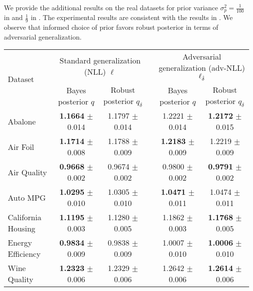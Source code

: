 We provide the additional results on the real datasets for prior variance $\sigma_p^2 = \frac{1}{100}$ in  and $\frac{1}{9}$ in . The experimental results are consistent with the results in . We observe that informed choice of prior favors robust posterior in terms of adversarial generalization.

\begin{table*}[h]
    \centering
    \begin{tabular}{lccccc}
    \toprule
    \multirow{2}{*}{Dataset}  %
       & \multicolumn{2}{c}{Standard generalization (NLL) $\ell$} & \phantom{}& \multicolumn{2}{c}{Adversarial generalization (adv-NLL) $\ell_{\hat{\delta}}$} \\
       & Bayes posterior $q$  & Robust posterior  $q_{\delta}$ & \phantom{}& Bayes posterior $q$ & Robust posterior $q_{\delta}$  \\
       \midrule
       Abalone & \textbf{1.1664} \tiny{$\pm$ 0.014} & 1.1797 \tiny{$\pm$ 0.014} && 1.2221 \tiny{$\pm$ 0.014} & \textbf{1.2172} \tiny{$\pm$ 0.015} \\
       Air Foil & \textbf{1.1714} \tiny{$\pm$ 0.008} & 1.1788 \tiny{$\pm$ 0.009} && \textbf{1.2183} \tiny{$\pm$ 0.009} & {1.2219} \tiny{$\pm$ 0.009} \\
       Air Quality & \textbf{0.9668} \tiny{$\pm$ 0.002} & 0.9674 \tiny{$\pm$ 0.002} && 0.9800 \tiny{$\pm$ 0.002} & \textbf{0.9791} \tiny{$\pm$ 0.002} \\
       Auto MPG & \textbf{1.0295} \tiny{$\pm$ 0.010} & 1.0305 \tiny{$\pm$ 0.010} && \textbf{1.0471} \tiny{$\pm$ 0.011} & {1.0474} \tiny{$\pm$ 0.011} \\
       California Housing & \textbf{1.1195} \tiny{$\pm$ 0.003} & 1.1280 \tiny{$\pm$ 0.005} && 1.1862 \tiny{$\pm$ 0.003} & \textbf{1.1768} \tiny{$\pm$ 0.005} \\
       Energy Efficiency & \textbf{0.9834} \tiny{$\pm$ 0.009} & 0.9838 \tiny{$\pm$ 0.009} && 1.0007 \tiny{$\pm$ 0.010} & \textbf{1.0006} \tiny{$\pm$ 0.010} \\
       Wine Quality & \textbf{1.2323} \tiny{$\pm$ 0.006} & 1.2329 \tiny{$\pm$ 0.006} && 1.2642 \tiny{$\pm$ 0.006} & \textbf{1.2614} \tiny{$\pm$ 0.006} \\

\end{tabular}
\end{table*}
